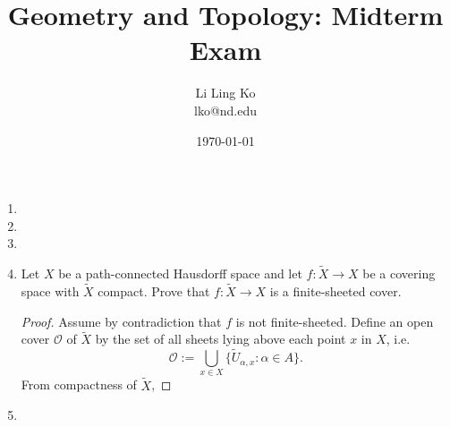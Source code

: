 \documentclass{article}
\begin{document}
\title{Geometry and Topology: Midterm Exam}
\author{Li Ling Ko\\ lko@nd.edu}
\date{\today}
\maketitle

\begin{enumerate}[label={\bf Q\arabic*:}]
  \item

  \item

  \item

  \item Let $X$ be a path-connected Hausdorff space and let
    $f:\widetilde{X}\rightarrow X$ be a covering space with $\widetilde{X}$
    compact. Prove that $f:\widetilde{X}\rightarrow X$  is a
    finite-sheeted cover.

    \begin{proof}
      Assume by contradiction that $f$ is not finite-sheeted. Define an
      open cover $\mathcal{O}$ of $\widetilde{X}$ by the set of all sheets
      lying above each point $x$ in $X$, i.e.
      \begin{equation*}
        \mathcal{O} := \bigcup_{x\in X}
          \{\widetilde{U}_{\alpha,x}:\alpha\in A\}.
      \end{equation*}
      From compactness of $\widetilde{X}$,
    \end{proof}

  \item
\end{enumerate}
\end{document}
